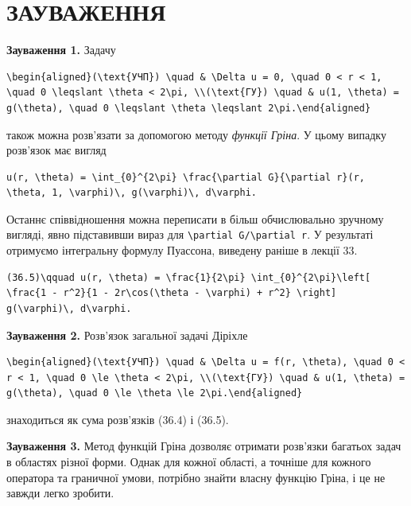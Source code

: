 \documentclass[
  ukrainian,
]{article}
\begin{document}
\section{ЗАУВАЖЕННЯ}\label{ux437ux430ux443ux432ux430ux436ux435ux43dux43dux44f-7}

\textbf{Зауваження 1.} Задачу

\begin{verbatim}
\begin{aligned}(\text{УЧП}) \quad & \Delta u = 0, \quad 0 < r < 1, \quad 0 \leqslant \theta < 2\pi, \\(\text{ГУ}) \quad & u(1, \theta) = g(\theta), \quad 0 \leqslant \theta \leqslant 2\pi.\end{aligned}
\end{verbatim}

також можна розв'язати за допомогою методу \emph{функції Гріна}. У цьому
випадку розв'язок має вигляд

\begin{verbatim}
u(r, \theta) = \int_{0}^{2\pi} \frac{\partial G}{\partial r}(r, \theta, 1, \varphi)\, g(\varphi)\, d\varphi.
\end{verbatim}

Останнє співвідношення можна переписати в більш обчислювально зручному
вигляді, явно підставивши вираз для
\texttt{\textbackslash{}partial\ G/\textbackslash{}partial\ r}. У
результаті отримуємо інтегральну формулу Пуассона, виведену раніше в
лекції 33.

\begin{verbatim}
(36.5)\qquad u(r, \theta) = \frac{1}{2\pi} \int_{0}^{2\pi}\left[ \frac{1 - r^2}{1 - 2r\cos(\theta - \varphi) + r^2} \right] g(\varphi)\, d\varphi.
\end{verbatim}

\textbf{Зауваження 2.} Розв'язок загальної задачі Діріхле

\begin{verbatim}
\begin{aligned}(\text{УЧП}) \quad & \Delta u = f(r, \theta), \quad 0 < r < 1, \quad 0 \le \theta < 2\pi, \\(\text{ГУ}) \quad & u(1, \theta) = g(\theta), \quad 0 \le \theta \le 2\pi.\end{aligned}
\end{verbatim}

знаходиться як сума розв'язків (36.4) і (36.5).

\textbf{Зауваження 3.} Метод функцій Гріна дозволяє отримати розв'язки
багатьох задач в областях різної форми. Однак для кожної області, а
точніше для кожного оператора та граничної умови, потрібно знайти власну
функцію Гріна, і це не завжди легко зробити.
\end{document}
